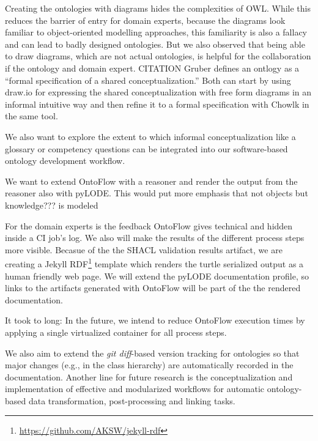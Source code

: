 \documentclass[runningheads]{llncs}
\begin{document}
Creating the ontologies with diagrams hides the complexities of OWL. While this reduces the barrier of entry for domain experts, because the diagrams look familiar to object-oriented modelling approaches, this familiarity is also a fallacy and can lead to badly designed ontologies.
But we also observed that being able to draw diagrams, which are not actual ontologies, is helpful for the collaboration if the ontology and domain expert. CITATION Gruber defines an ontlogy as a “formal specification of a shared conceptualization.” Both can start by using draw.io for expressing the shared conceptualization with free form diagrams in an informal intuitive way and then refine it to a formal specification with Chowlk in the same tool.

We also want to explore the extent to which informal conceptualization like a glossary or competency questions can be integrated into our software-based ontology development workflow.


We want to extend OntoFlow with a reasoner and render the output from the reasoner also with pyLODE. This would put more emphasis that not objects but knowledge??? is modeled 



For the domain experts is the feedback OntoFlow gives technical and hidden inside a CI job's log. We also will make the results of the different process steps more visible. 
Becasue of the the SHACL validation results artifact, we are creating a Jekyll RDF\footnote{\url{https://github.com/AKSW/jekyll-rdf}} template which renders the turtle serialized output as a human friendly web page.
We will extend the pyLODE documentation profile, so links to the artifacts generated with OntoFlow will be part of the the rendered documentation. 




It took to long: In the future, we intend to reduce OntoFlow execution times by applying a single virtualized container for all process steps.


We also aim to extend the \textit{git diff}-based version tracking for ontologies so that major changes (e.g., in the class hierarchy) are automatically recorded in the documentation. Another line for future research is the conceptualization and implementation of effective and modularized workflows for automatic ontology-based data transformation, post-processing and linking tasks.

%
%
% 
% 


\end{document}
